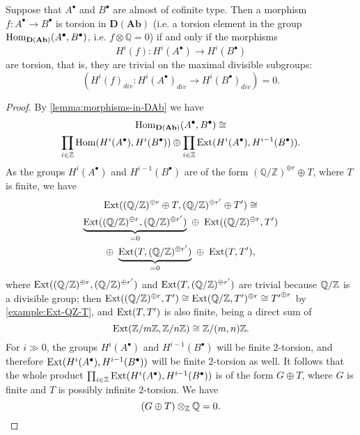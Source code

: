 \begin{observation}
  \label{obs:torsion-morphisms-in-DAb}
  Suppose that $A^\bullet$ and $B^\bullet$ are almost of cofinite type. Then
  a morphism $f\colon A^\bullet\to B^\bullet$ is torsion in
  $\mathbf{D} (\mathbf{Ab})$ (i.e. a torsion element in the group
  $\operatorname{Hom}_{\mathbf{D} (\mathbf{Ab})} (A^\bullet, B^\bullet)$, i.e.
  $f\otimes \mathbb{Q} = 0$) if and only if the morphisms
  $$H^i (f)\colon H^i (A^\bullet) \to H^i (B^\bullet)$$
  are torsion, that is, they are trivial on the maximal divisible subgroups:
  $$(H^i (f)_{div}\colon H^i (A^\bullet)_{div} \to H^i (B^\bullet)_{div}) = 0.$$

  \begin{proof}
    By \ref{lemma:morphisms-in-DAb} we have
    \begin{multline*}
      \operatorname{Hom}_{\text{\bf D} (\text{\bf Ab})} (A^\bullet, B^\bullet) \cong \\
      \prod_{i\in\mathbb{Z}} \operatorname{Hom} (H^i (A^\bullet), H^i (B^\bullet)) \oplus
      \prod_{i\in\mathbb{Z}} \operatorname{Ext} (H^i (A^\bullet), H^{i-1} (B^\bullet)).
    \end{multline*}
    As the groups $H^i (A^\bullet)$ and $H^{i-1} (B^\bullet)$ are of the form
    $(\mathbb{Q}/\mathbb{Z})^{\oplus r} \oplus T$, where $T$ is finite, we have
    \begin{multline*}
      \operatorname{Ext} ((\mathbb{Q}/\mathbb{Z})^{\oplus r} \oplus T, (\mathbb{Q}/\mathbb{Z})^{\oplus r'} \oplus T') \cong \\
      \underbrace{\operatorname{Ext} ((\mathbb{Q}/\mathbb{Z})^{\oplus r}, (\mathbb{Q}/\mathbb{Z})^{\oplus r'})}_{=0}
      ~ \oplus ~
      \operatorname{Ext} ((\mathbb{Q}/\mathbb{Z})^{\oplus r}, T') \\
      \oplus ~ \underbrace{\operatorname{Ext} (T, (\mathbb{Q}/\mathbb{Z})^{\oplus r'})}_{=0}
      ~ \oplus ~
      \operatorname{Ext} (T, T'),
    \end{multline*}
    where $\operatorname{Ext} ((\mathbb{Q}/\mathbb{Z})^{\oplus r}, (\mathbb{Q}/\mathbb{Z})^{\oplus r'})$ and
    $\operatorname{Ext} (T, (\mathbb{Q}/\mathbb{Z})^{\oplus r'})$ are trivial because $\mathbb{Q}/\mathbb{Z}$ is a
    divisible group; then
    $\operatorname{Ext} ((\mathbb{Q}/\mathbb{Z})^{\oplus r}, T') \cong \operatorname{Ext} (\mathbb{Q}/\mathbb{Z}, T')^{\oplus r} \cong {T'}^{\oplus r}$
    by \ref{example:Ext-QZ-T}, and $\operatorname{Ext} (T,T')$ is also finite, being a direct
    sum of
    $$\operatorname{Ext} (\mathbb{Z}/m\mathbb{Z}, \mathbb{Z}/n\mathbb{Z}) \cong \mathbb{Z}/(m,n)\mathbb{Z}.$$
    For $i \gg 0$, the groups $H^i (A^\bullet)$ and $H^{i-1} (B^\bullet)$ will
    be finite $2$-torsion, and therefore
    $\operatorname{Ext} (H^i (A^\bullet), H^{i-1} (B^\bullet))$ will be finite $2$-torsion as
    well. It follows that the whole product
    $\prod_{i\in \mathbb{Z}} \operatorname{Ext} (H^i (A^\bullet), H^{i-1} (B^\bullet))$ is of
    the form $G \oplus T$, where $G$ is finite and $T$ is possibly infinite
    $2$-torsion. We have
    $$(G \oplus T)\otimes_{\mathbb{Z}} \mathbb{Q} = 0.$$


\end{proof}
\end{observation}
